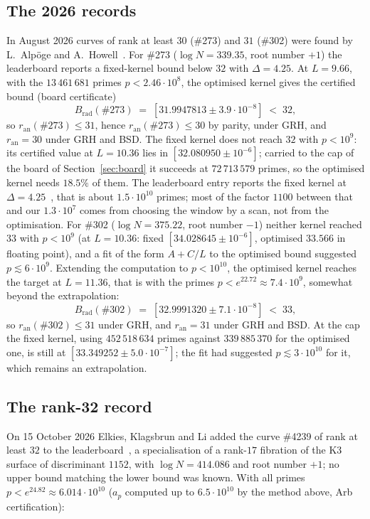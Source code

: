 \documentclass[11pt]{amsart}
\theoremstyle{remark}
\theoremstyle{definition}
\newcommand{\ran}{r_{\mathrm{an}}}
\begin{document}
\subsection*{The 2026 records}
In August 2026 curves of rank at least $30$ (\#273) and $31$ (\#302) were found by L.~Alp\"oge and A.~Howell~\cite{ICARM}. For \#273 ($\log N=339.35$, root number $+1$) the leaderboard reports a fixed-kernel bound below $32$ with $\Delta=4.25$. At $L=9.66$, with the $13\,461\,681$ primes $p<2.46\cdot10^8$, the optimised kernel gives the certified bound (board certificate)
\[
B_{\mathrm{rad}}(\#273)\;=\;[31.9947813\pm3.9\cdot10^{-8}]\;<\;32,
\]
so $\ran(\#273)\le31$, hence $\ran(\#273)\le30$ by parity, under GRH, and $\ran=30$ under GRH and BSD. The fixed kernel does not reach $32$ with $p<10^9$: its certified value at $L=10.36$ lies in $[32.080950\pm10^{-6}]$; carried to the cap of the board of
Section~\ref{sec:board} it succeeds at $72\,713\,579$ primes, so the optimised kernel needs $18.5\%$ of
them. The leaderboard entry reports the fixed kernel at $\Delta=4.25$~\cite{ICARM}, that is about
$1.5\cdot10^{10}$ primes; most of the factor $1100$ between that and our $1.3\cdot10^7$ comes from choosing the window by a scan, not from
the optimisation. For \#302 ($\log N=375.22$, root number $-1$) neither kernel reached $33$ with $p<10^9$ (at $L=10.36$:
fixed $[34.028645\pm10^{-6}]$, optimised $33.566$ in floating point), and a fit of the form $A+C/L$ to the optimised
bound suggested $p\lesssim6\cdot10^9$. Extending the computation to $p<10^{10}$, the optimised kernel reaches the target at $L=11.36$, that is with the primes $p<e^{22.72}\approx7.4\cdot10^9$, somewhat beyond the extrapolation:
\[
 B_{\mathrm{rad}}(\#302)\;=\;[32.9991320\pm7.1\cdot10^{-8}]\;<\;33 ,
\]
so $\ran(\#302)\le31$ under GRH, and $\ran=31$ under GRH and BSD. At the cap the fixed kernel, using $452\,518\,634$ primes against $339\,885\,370$
for the optimised one, is still at $[33.349252\pm5.0\cdot10^{-7}]$; the fit had suggested $p\lesssim3\cdot10^{10}$ for it, which
remains an extrapolation.

\subsection*{The rank-32 record}\label{sec:4239}
On 15 October 2026 Elkies, Klagsbrun and Li added the curve \#4239 of rank at least $32$ to the leaderboard~\cite{ICARM}, a specialisation of a rank-$17$ fibration of the K3 surface of discriminant $1152$, with $\log N=414.086$ and root number $+1$; no upper bound matching the lower bound was known. With all primes $p<e^{24.82}\approx6.014\cdot10^{10}$ ($a_p$ computed up to $6.5\cdot10^{10}$ by the method above, Arb certification):
\end{document}
